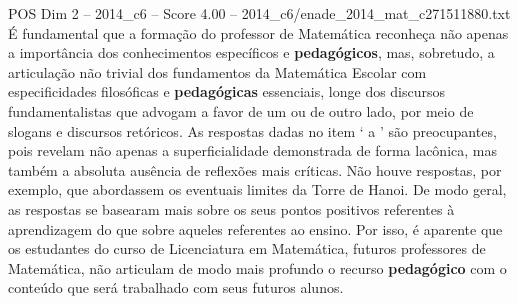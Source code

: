 \begin{textsample}{POS Dim 2 – 2014\_c6 – Score 4.00 – 2014\_c6/enade\_2014\_mat\_c271511880.txt}
É fundamental que a formação do professor de Matemática reconheça não apenas a importância dos conhecimentos específicos e \textbf{pedagógicos}, mas, sobretudo, a articulação não trivial dos fundamentos da Matemática Escolar com especificidades filosóficas e \textbf{pedagógicas} essenciais, longe dos discursos fundamentalistas que advogam a favor de um ou de outro lado, por meio de slogans e discursos retóricos.
As respostas dadas no item ‘ a ’ são preocupantes, pois revelam não apenas a superficialidade demonstrada de forma lacônica, mas também a absoluta ausência de reflexões mais críticas.
Não houve respostas, por exemplo, que abordassem os eventuais limites da Torre de Hanoi.
De modo geral, as respostas se basearam mais sobre os seus pontos positivos referentes à aprendizagem do que sobre aqueles referentes ao ensino.
Por isso, é aparente que os estudantes do curso de Licenciatura em Matemática, futuros professores de Matemática, não articulam de modo mais profundo o recurso \textbf{pedagógico} com o conteúdo que será trabalhado com seus futuros alunos.

\end{textsample}
